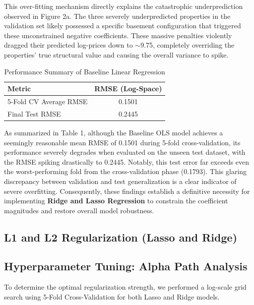 \documentclass[11pt]{article}
\begin{document}
\begin{itemize}[leftmargin=*]
This over-fitting mechanism directly explains the catastrophic underprediction observed in Figure 2a. The three severely underpredicted properties in the validation set likely possessed a specific basement configuration that triggered these unconstrained negative coefficients. These massive penalties violently dragged their predicted log-prices down to $\sim$9.75, completely overriding the properties' true structural value and causing the overall variance to spike.

\end{itemize}

\begin{table}[H]
\centering
\label{tab:baseline_results}
\begin{tabular}{lc}
\hline
\textbf{Metric} & \textbf{RMSE (Log-Space)} \\ \hline
5-Fold CV Average RMSE & 0.1501 \\
Final Test RMSE & 0.2445 \\ \hline
\end{tabular}
\caption{Performance Summary of Baseline Linear Regression}
\end{table}

As summarized in Table 1, although the Baseline OLS model achieves a seemingly reasonable mean RMSE of 0.1501 during 5-fold cross-validation, its performance severely degrades when evaluated on the unseen test dataset, with the RMSE spiking drastically to 0.2445. Notably, this test error far exceeds even the worst-performing fold from the cross-validation phase (0.1793). This glaring discrepancy between validation and test generalization is a clear indicator of severe overfitting. Consequently, these findings establish a definitive necessity for implementing \textbf{Ridge and Lasso Regression} to constrain the coefficient magnitudes and restore overall model robustness.

\subsection{L1 and L2 Regularization (Lasso and Ridge)}
\subsection{Hyperparameter Tuning: Alpha Path Analysis}
To determine the optimal regularization strength, we performed a log-scale grid search using 5-Fold Cross-Validation for both Lasso and Ridge models.
\end{document}

